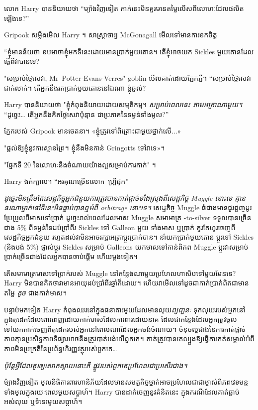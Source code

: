 លោក Harry បាននិយាយថា “ម្យ៉ាងវិញទៀត កាក់នេះមិនគួរមានតម្លៃលើសពីលោហៈដែលផលិតឡើងទេ?”

Gripook សម្លឹងមើល Harry ។ សាស្រ្តាចារ្យ McGonagall មើលទៅមានការខកចិត្ត

“ខ្ញុំ​មាន​ន័យ​ថា ឧបមា​ថា​ខ្ញុំ​មក​ទី​នេះ​ដោយ​មាន​ប្រាក់​មួយ​តោន។ តើខ្ញុំអាចយក Sickles មួយតោនដែលធ្វើពីវាបានទេ?

"សម្រាប់ថ្លៃសេវា, Mr~Potter-Evans-Verres" goblin មើលគាត់ដោយភ្នែកភ្លឺ។ “សម្រាប់ថ្លៃសេវាជាក់លាក់។ តើអ្នកនឹងរកប្រាក់មួយតោននៅឯណា ខ្ញុំឆ្ងល់?

Harry បាននិយាយថា "ខ្ញុំកំពុងនិយាយដោយសម្មតិកម្ម។ \emph{សម្រាប់ពេលនេះ តាមអត្រាណាមួយ។} “ដូច្នេះ… តើអ្នកនឹងគិតថ្លៃសេវាប៉ុន្មាន ជាប្រភាគនៃទម្ងន់ទាំងមូល?”

ភ្នែករបស់ Gripook មានចេតនា។ «ខ្ញុំ​ត្រូវ​ទៅ​ពិគ្រោះ​ជាមួយ​ថ្នាក់​លើ...»

"ផ្តល់ឱ្យខ្ញុំនូវការស្មានព្រៃ។ ខ្ញុំនឹងមិនកាន់ Gringotts ទៅវាទេ»។

"ផ្នែកទី 20 នៃលោហៈនឹងចំណាយយ៉ាងល្អសម្រាប់ការកាក់" ។

Harry ងក់ក្បាល។ “អរគុណច្រើនលោក~ហ្គ្រីផូក”

\emph{ដូច្នេះមិនត្រឹមតែសេដ្ឋកិច្ចអ្នកជំនួយការត្រូវបានកាត់ផ្តាច់ទាំងស្រុងពីសេដ្ឋកិច្ច Muggle នោះទេ គ្មាននរណាម្នាក់នៅទីនេះមិនធ្លាប់បានឮអំពី arbitrage នោះទេ។} សេដ្ឋកិច្ច Muggle ធំជាងមានជួរជួញដូរប្រែប្រួលពីមាសទៅប្រាក់ ដូច្នេះរាល់ពេលដែលមាស Muggle សមាមាត្រ -to-silver ទទួលបានច្រើនជាង 5\% ពីទម្ងន់នៃដប់ប្រាំពីរ Sickles ទៅ Galleon មួយ ទាំងមាស ឬប្រាក់ គួរតែហូរចេញពីសេដ្ឋកិច្ចអ្នកជំនួយ រហូតដល់វាមិនអាចរក្សាអត្រាប្តូរប្រាក់បាន។ នាំយកប្រាក់មួយតោន ប្តូរទៅ Sickles (និងបង់ 5\%) ផ្លាស់ប្តូរ Sickles សម្រាប់ Galleons យកមាសទៅកាន់ពិភព Muggle ប្តូរវាសម្រាប់ប្រាក់ច្រើនជាងដែលអ្នកបានចាប់ផ្តើម ហើយម្តងទៀត។

តើសមាមាត្រមាសទៅប្រាក់របស់ Muggle នៅកន្លែងណាមួយប្រហែលហាសិបទៅមួយមែនទេ? Harry មិន​បាន​គិត​ថា​វា​មាន​អាយុ​ដប់ប្រាំពីរ​ឆ្នាំ​ក៏​ដោយ។ ហើយវាមើលទៅដូចជាកាក់ប្រាក់ពិតជាមានតម្លៃ \emph{តូច} ជាងកាក់មាស។

បន្ទាប់មកទៀត Harry កំពុងឈរនៅក្នុងធនាគារមួយដែលមានលុយ\emph{ព្យញ្ជនៈ} ទុកលុយរបស់អ្នកនៅក្នុងតុដេកដែលពោរពេញដោយកាក់មាសដែលការពារដោយនាគ ដែលជាកន្លែងដែលអ្នកត្រូវចូលទៅយកកាក់ចេញពីតុដេករបស់អ្នកនៅពេលណាដែលអ្នកចង់ចំណាយ។ ចំនុចល្អជាងនៃការកាត់ផ្តាច់ភាពគ្មានប្រសិទ្ធភាពទីផ្សារអាចនឹងត្រូវបាត់បង់លើពួកគេ។ គាត់​ត្រូវ​បាន​គេ​ល្បួង​ឱ្យ​ធ្វើ​ការ​កត់​សម្គាល់​អំពី​ភាព​មិន​ប្រក្រតី​នៃ​ប្រព័ន្ធ​ហិរញ្ញវត្ថុ​របស់​ពួក​គេ…

\emph{ប៉ុន្តែអ្វីដែលគួរឲ្យសោកស្ដាយនោះគឺ ផ្លូវរបស់ពួកគេប្រហែលជាប្រសើរជាង។}

ម៉្យាងវិញទៀត មូលនិធិការពារហានិភ័យដែលមានសមត្ថកិច្ចម្នាក់អាចប្រហែលជាជាម្ចាស់ពិភពវេទមន្តទាំងមូលក្នុងរយៈពេលមួយសប្តាហ៍។ Harry បានដាក់ចេញនូវគំនិតនេះ ក្នុងករណីដែលគាត់ធ្លាប់អស់លុយ ឬទំនេរមួយសប្តាហ៍។

